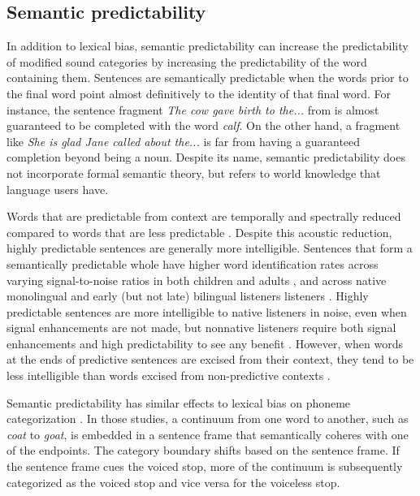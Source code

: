 \subsection{Semantic predictability}
\label{sec:semanticpredictability}

In addition to lexical bias, semantic predictability \citep{Kalikow1977} can increase the predictability of modified sound categories by increasing the predictability of the word containing them.
Sentences are semantically predictable when the words prior to the final word point almost definitively to the identity of that final word.  
For instance, the sentence fragment \emph{The cow gave birth to the...} from \citet{Kalikow1977} is almost guaranteed to be completed with the word \emph{calf}.  
On the other hand, a fragment like \emph{She is glad Jane called about the...} is far from having a guaranteed completion beyond being a noun.
Despite its name, semantic predictability does not incorporate formal semantic theory, but refers to world knowledge that language users have.

Words that are predictable from context are temporally and spectrally reduced compared to words that are less predictable \citep{Scarborough2010, Clopper2008}. 
Despite this acoustic reduction, highly predictable sentences are generally more intelligible.
Sentences that form a semantically predictable whole have higher word identification rates across varying signal-to-noise ratios \citep{Kalikow1977} in both children and adults \citep{Fallon2002}, and across native monolingual and early (but not late) bilingual listeners listeners \citep{Mayo1997}.
Highly predictable sentences are more intelligible to native listeners in noise, even when signal enhancements are not made, but nonnative listeners require both signal enhancements and high predictability to see any benefit \citep{Bradlow2007}.
However, when words at the ends of predictive sentences are excised from their context, they tend to be less intelligible than words excised from non-predictive contexts \citep{Lieberman1963}.

Semantic predictability has similar effects to lexical bias on phoneme categorization \citep{Connine1987, Borsky1998}.  
In those studies, a continuum from one word to another, such as \emph{coat} to \emph{goat}, is embedded in a sentence frame that semantically coheres with one of the endpoints.  
The category boundary shifts based on the sentence frame.
If the sentence frame cues the voiced stop, more of the continuum is subsequently categorized as the voiced stop and vice versa for the voiceless stop.

